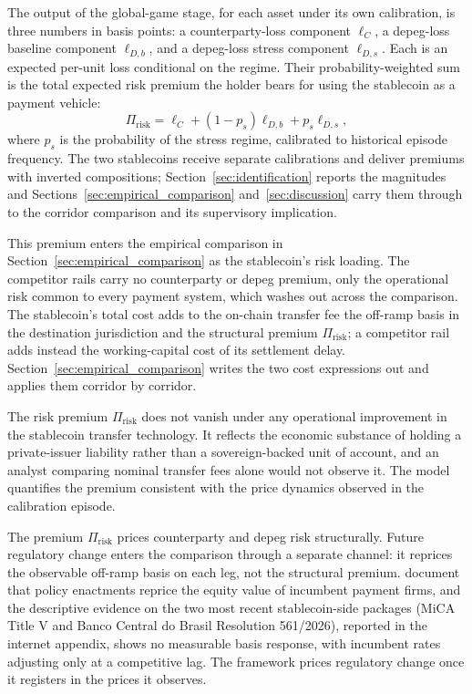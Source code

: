 The output of the global-game stage, for each asset under its own calibration, is three numbers in basis points: a counterparty-loss component $\ell_C$, a depeg-loss baseline component $\ell_{D,b}$, and a depeg-loss stress component $\ell_{D,s}$. Each is an expected per-unit loss conditional on the regime. Their probability-weighted sum is the total expected risk premium the holder bears for using the stablecoin as a payment vehicle:
\begin{equation}\label{eq:total_risk_premium}
\Pi_{\text{risk}} = \ell_C + (1-p_s)\ell_{D,b} + p_s \ell_{D,s},
\end{equation}
where $p_s$ is the probability of the stress regime, calibrated to historical episode frequency. The two stablecoins receive separate calibrations and deliver premiums with inverted compositions; Section~\ref{sec:identification} reports the magnitudes and Sections~\ref{sec:empirical_comparison} and~\ref{sec:discussion} carry them through to the corridor comparison and its supervisory implication.

This premium enters the empirical comparison in Section~\ref{sec:empirical_comparison} as the stablecoin's risk loading. The competitor rails carry no counterparty or depeg premium, only the operational risk common to every payment system, which washes out across the comparison. The stablecoin's total cost adds to the on-chain transfer fee the off-ramp basis in the destination jurisdiction and the structural premium $\Pi_{\text{risk}}$; a competitor rail adds instead the working-capital cost of its settlement delay. Section~\ref{sec:empirical_comparison} writes the two cost expressions out and applies them corridor by corridor.

The risk premium $\Pi_{\text{risk}}$ does not vanish under any operational improvement in the stablecoin transfer technology. It reflects the economic substance of holding a private-issuer liability rather than a sovereign-backed unit of account, and an analyst comparing nominal transfer fees alone would not observe it. The model quantifies the premium consistent with the price dynamics observed in the calibration episode.

The premium $\Pi_{\text{risk}}$ prices counterparty and depeg risk structurally. Future regulatory change enters the comparison through a separate channel: it reprices the observable off-ramp basis on each leg, not the structural premium. \citet{copestake_etal_2026} document that policy enactments reprice the equity value of incumbent payment firms, and the descriptive evidence on the two most recent stablecoin-side packages (MiCA Title V and Banco Central do Brasil Resolution 561/2026), reported in the internet appendix, shows no measurable basis response, with incumbent rates adjusting only at a competitive lag. The framework prices regulatory change once it registers in the prices it observes.

